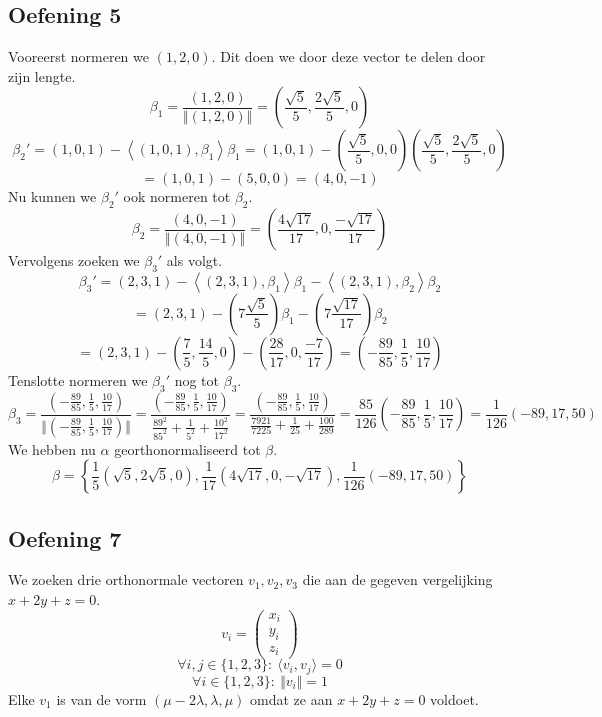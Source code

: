 \documentclass[lineaire_algebra_oplossingen.tex]{subfiles}
\begin{document}
\subsection{Oefening 5}
Vooreerst normeren we $(1,2,0)$. Dit doen we door deze vector te delen door zijn lengte.
\[
\beta_1 = \frac{(1,2,0)}{\Vert(1,2,0)\Vert}
= \left(\frac{\sqrt{5}}{5},\frac{2\sqrt{5}}{5},0\right)
\]
\[
\beta_2' = (1,0,1) - \left\langle (1,0,1),\beta_1 \right\rangle \beta_1
= (1,0,1) - \left(\frac{\sqrt{5}}{5},0,0\right)\left(\frac{\sqrt{5}}{5},\frac{2\sqrt{5}}{5},0\right)
\]
\[
=(1,0,1) - (5,0,0) = (4,0,-1)
\]
Nu kunnen we $\beta_2'$ ook normeren tot $\beta_2$.
\[
\beta_2 = \frac{(4,0,-1)}{\Vert (4,0,-1)\Vert}
= \left( \frac{4\sqrt{17}}{17},0,\frac{-\sqrt{17}}{17} \right)
\]
Vervolgens zoeken we $\beta_3'$ als volgt.
\[
\beta_3'
= (2,3,1)
- \left\langle (2,3,1),\beta_1\right\rangle\beta_1
- \left\langle (2,3,1),\beta_2\right\rangle\beta_2
\]
\[
= (2,3,1)
- \left(7\frac{\sqrt{5}}{5}\right)  \beta_1
- \left(7\frac{\sqrt{17}}{17} \right)  \beta_2
\]
\[
=(2,3,1)
- \left(\frac{7}{5},\frac{14}{5},0\right)
- \left( \frac{28}{17},0,\frac{-7}{17} \right)
= 
\left(-\frac{89}{85},\frac{1}{5},\frac{10}{17}\right)
\]
Tenslotte normeren we $\beta_3'$ nog tot $\beta_3$.
\[
\beta_3 = 
\frac{\left(-\frac{89}{85},\frac{1}{5},\frac{10}{17}\right)}
{\Vert\left(-\frac{89}{85},\frac{1}{5},\frac{10}{17}\right)\Vert}
= 
\frac{\left(-\frac{89}{85},\frac{1}{5},\frac{10}{17}\right)}
{\frac{89^2}{85^2}+\frac{1}{5^2}+\frac{10^2}{17^2}}
=
\frac{\left(-\frac{89}{85},\frac{1}{5},\frac{10}{17}\right)}
{\frac{7921}{7225}+\frac{1}{25}+\frac{100}{289}}
=
\frac{85}{126}
\left(-\frac{89}{85},\frac{1}{5},\frac{10}{17}\right)
=
\frac{1}{126}
\left(-89,17,50\right)
\]
We hebben nu $\alpha$ georthonormaliseerd tot $\beta$.
\[
\beta
=
\left\{
\frac{1}{5}
\left(\sqrt{5},2\sqrt{5},0\right)
,
\frac{1}{17}
\left( 4\sqrt{17},0,-\sqrt{17} \right)
,
\frac{1}{126}
\left(-89,17,50\right)
\right\}
\]

\subsection{Oefening 7}
We zoeken drie orthonormale vectoren $v_1,v_2,v_3$ die aan de gegeven vergelijking $x+2y+z = 0$.
\[
v_i =
\begin{pmatrix}
x_i\\y_i\\z_i
\end{pmatrix}
\]
\[
\forall i,j\in \{1,2,3\}:\ \langle v_i,v_j\rangle = 0
\]
\[
\forall i\in \{1,2,3\}:\ \Vert v_i\Vert = 1
\]
Elke $v_1$ is van de vorm $(\mu - 2\lambda,\lambda,\mu)$ omdat ze aan $x+2y+z=0$ voldoet.
\end{document}
